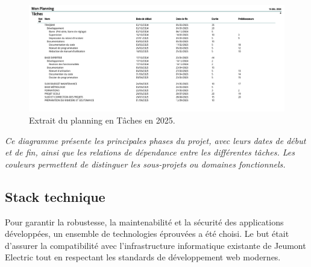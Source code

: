 \documentclass[11pt,a4paper]{article}
\begin{document}
\begin{itemize}
    
\begin{figure}[H]
    \centering
    \includegraphics[width=\textwidth]{../Images/planning-sur-2025.png}
    \caption{Extrait du planning en Tâches en 2025.}
\end{figure}	
	
\smallskip
\begin{center}
    \small \textit{Ce diagramme présente les principales phases du projet, avec leurs dates de début et de fin, ainsi que les relations de dépendance entre les différentes tâches. Les couleurs permettent de distinguer les sous-projets ou domaines fonctionnels.}
\end{center}
	
\end{itemize}
	
\subsection{Stack technique}

Pour garantir la robustesse, la maintenabilité et la sécurité des applications développées, un ensemble de technologies éprouvées a été choisi. Le but était d'assurer la compatibilité avec l’infrastructure informatique existante de Jeumont Electric tout en respectant les standards de développement web modernes.
\end{document}
